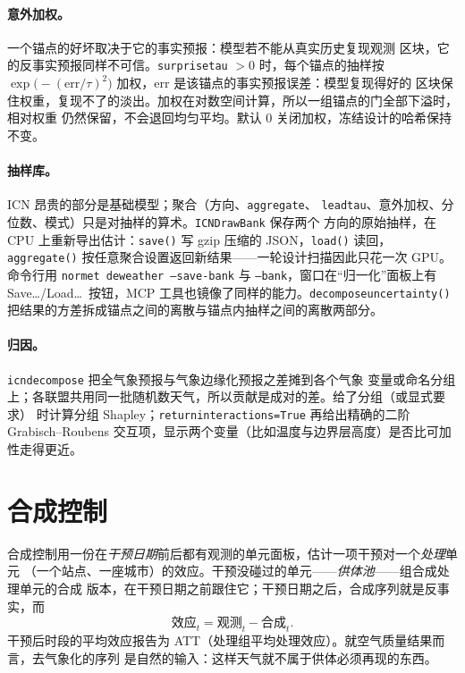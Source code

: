 \documentclass[11pt]{ctexrep}
\newcommand{\codeunderscore}{\textunderscore\allowbreak}
\newcommand{\code}[1]{\texttt{\let\_\codeunderscore #1}}
\begin{document}
\paragraph{意外加权。}一个锚点的好坏取决于它的事实预报：模型若不能从真实历史复现观测
区块，它的反事实预报同样不可信。\code{surprise\_tau} $>0$ 时，每个锚点的抽样按
$\exp\bigl(-(\text{err}/\tau)^2\bigr)$ 加权，err 是该锚点的事实预报误差：模型复现得好的
区块保住权重，复现不了的淡出。加权在对数空间计算，所以一组锚点的门全部下溢时，相对权重
仍然保留，不会退回均匀平均。默认 0 关闭加权，冻结设计的哈希保持不变。

\paragraph{抽样库。}ICN 昂贵的部分是基础模型；聚合（方向、\code{aggregate}、
\code{lead\_tau}、意外加权、分位数、模式）只是对抽样的算术。\code{ICNDrawBank} 保存两个
方向的原始抽样，在 CPU 上重新导出估计：\code{save()} 写 gzip 压缩的 JSON，\code{load()}
读回，\code{aggregate()} 按任意聚合设置返回新结果——一轮设计扫描因此只花一次 GPU。
命令行用 \code{normet deweather --save-bank} 与 \code{--bank}，窗口在“归一化”面板上有
Save\dots/Load\dots\ 按钮，MCP 工具也镜像了同样的能力。\code{decompose\_uncertainty()}
把结果的方差拆成锚点之间的离散与锚点内抽样之间的离散两部分。

\paragraph{归因。}\code{icn\_decompose} 把全气象预报与气象边缘化预报之差摊到各个气象
变量或命名分组上；各联盟共用同一批随机数天气，所以贡献是成对的差。给了分组（或显式要求）
时计算分组 Shapley；\code{return\_interactions=True} 再给出精确的二阶
Grabisch--Roubens 交互项，显示两个变量（比如温度与边界层高度）是否比可加性走得更近。

\section{合成控制}\label{sec:scmtheory}
合成控制用一份在\emph{干预日期}前后都有观测的单元面板，估计一项干预对一个\emph{处理}单元
（一个站点、一座城市）的效应。干预没碰过的单元——\emph{供体池}——组合成处理单元的合成
版本，在干预日期之前跟住它；干预日期之后，合成序列就是反事实，而
\begin{equation}
  \text{效应}_t = \text{观测}_t - \text{合成}_t .
\end{equation}
干预后时段的平均效应报告为 ATT（处理组平均处理效应）。就空气质量结果而言，去气象化的序列
是自然的输入：这样天气就不属于供体必须再现的东西。
\end{document}
